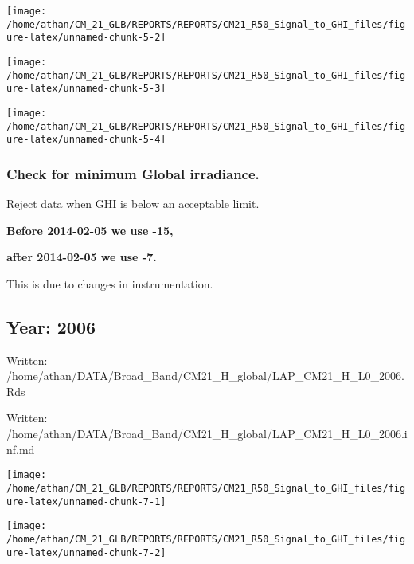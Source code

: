 \documentclass[
  11pt,
  a4paper,oneside]{article}
\begin{document}
\begin{center}\texttt{[image: /home/athan/CM\_21\_GLB/REPORTS/REPORTS/CM21\_R50\_Signal\_to\_GHI\_files/figure-latex/unnamed-chunk-5-2]} \end{center}

\begin{center}\texttt{[image: /home/athan/CM\_21\_GLB/REPORTS/REPORTS/CM21\_R50\_Signal\_to\_GHI\_files/figure-latex/unnamed-chunk-5-3]} \end{center}

\begin{center}\texttt{[image: /home/athan/CM\_21\_GLB/REPORTS/REPORTS/CM21\_R50\_Signal\_to\_GHI\_files/figure-latex/unnamed-chunk-5-4]} \end{center}

\hypertarget{check-for-minimum-global-irradiance.}{%
\subsubsection{Check for minimum Global irradiance.}\label{check-for-minimum-global-irradiance.}}

Reject data when GHI is below an acceptable limit.

\textbf{Before 2014-02-05 we use -15,}

\textbf{after 2014-02-05 we use -7.}

This is due to changes in instrumentation.

\FloatBarrier

\newpage

\hypertarget{year-2006}{%
\subsection{Year: 2006}\label{year-2006}}

Written: /home/athan/DATA/Broad\_Band/CM21\_H\_global/LAP\_CM21\_H\_L0\_2006.Rds

Written: /home/athan/DATA/Broad\_Band/CM21\_H\_global/LAP\_CM21\_H\_L0\_2006.inf.md

\begin{center}\texttt{[image: /home/athan/CM\_21\_GLB/REPORTS/REPORTS/CM21\_R50\_Signal\_to\_GHI\_files/figure-latex/unnamed-chunk-7-1]} \end{center}

\begin{center}\texttt{[image: /home/athan/CM\_21\_GLB/REPORTS/REPORTS/CM21\_R50\_Signal\_to\_GHI\_files/figure-latex/unnamed-chunk-7-2]} \end{center}
\end{document}
